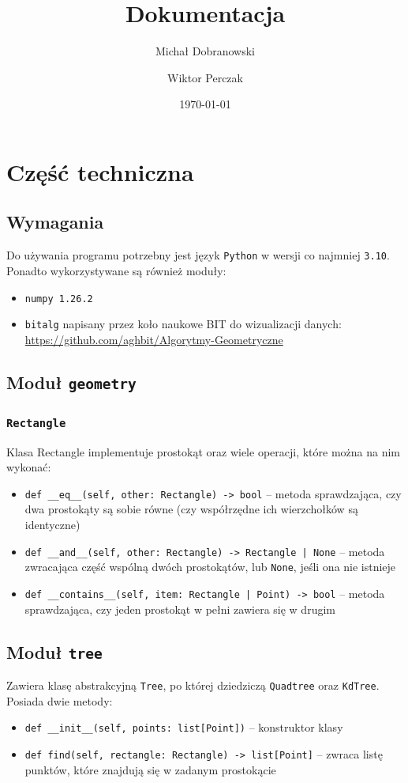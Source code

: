 \documentclass[12pt]{scrartcl}
\title{Dokumentacja}
\author{Michał Dobranowski \and Wiktor Perczak}
\date{\today}
\begin{document}
\maketitle
\tableofcontents
\newpage

\section{Część techniczna}

\subsection{Wymagania}
Do używania programu potrzebny jest język \texttt{Python} w wersji co najmniej \texttt{3.10}. Ponadto wykorzystywane są również moduły:
\begin{itemize}
    \item \texttt{numpy 1.26.2}
    \item \texttt {bitalg} napisany przez koło naukowe BIT do wizualizacji danych: \url{https://github.com/aghbit/Algorytmy-Geometryczne}
\end{itemize}

\subsection{Moduł \texttt{geometry}}

\subsubsection{\texttt{Rectangle}}
Klasa Rectangle implementuje prostokąt oraz wiele operacji, które można na nim wykonać:
\begin{itemize}
    \item \texttt{def \_\_eq\_\_(self, other: Rectangle) -> bool} -- metoda sprawdzająca, czy dwa prostokąty są sobie równe (czy współrzędne ich wierzchołków są identyczne)
    \item \texttt{def \_\_and\_\_(self, other: Rectangle) -> Rectangle | None} -- metoda zwracająca część wspólną dwóch prostokątów, lub \texttt{None}, jeśli ona nie istnieje
    \item \texttt{def \_\_contains\_\_(self, item: Rectangle | Point) -> bool} -- metoda sprawdzająca, czy jeden prostokąt w pełni zawiera się w drugim
\end{itemize}

\subsection{Moduł \texttt{tree}}
Zawiera klasę abstrakcyjną \texttt{Tree}, po której dziedziczą \texttt{Quadtree} oraz \texttt{KdTree}. Posiada dwie metody:
\begin{itemize}
    \item \texttt{def \_\_init\_\_(self, points: list[Point])} -- konstruktor klasy
    \item \texttt{def find(self, rectangle: Rectangle) -> list[Point]} -- zwraca listę punktów, które znajdują się w zadanym prostokącie
\end{itemize}
\end{document}
